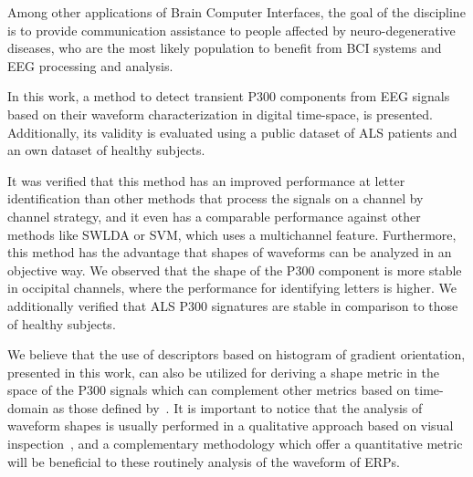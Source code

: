 \documentclass[utf8]{frontiersSCNS} %
\begin{document}


Among other applications of Brain Computer Interfaces, the goal of the discipline is to provide communication assistance to people affected by neuro-degenerative diseases, who are the most likely population to benefit from BCI systems and EEG processing and analysis.

In this work, a method to detect transient P300 components from EEG signals based on their waveform characterization in digital time-space, is presented.  Additionally, its validity is evaluated using a public dataset of ALS patients and an own dataset of healthy subjects. 


It was verified that this method has an improved performance at letter identification than other methods that process the signals on a channel by channel strategy, and it even has a comparable performance against other methods like SWLDA or SVM, which uses a multichannel feature.
Furthermore, this method has the advantage that shapes of waveforms can be analyzed in an objective way.  We observed that the shape of the P300 component is more stable in occipital channels, where the performance for identifying letters is higher.   We additionally verified that ALS P300 signatures are stable in comparison to those of healthy subjects.


We believe that the use of descriptors based on histogram of gradient orientation, presented in this work, can also be utilized for deriving a shape metric in the space of the P300 signals which can complement other metrics based on time-domain as those defined by~\cite{Mak2012}. It is important to notice that the analysis of waveform shapes is usually performed in a qualitative approach based on visual inspection~\citep{SellersandEmanuelDonchin2006}, and a complementary methodology which offer a quantitative metric will be beneficial to these routinely analysis of the waveform of ERPs.
\end{document}
